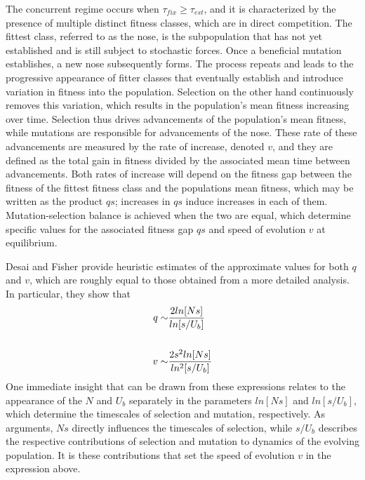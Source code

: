 \documentclass[12pt]{article}
\begin{document}
The concurrent regime occurs when $\tau_{fix} \ge \tau_{est}$, and it is characterized by the presence of multiple distinct fitness classes, which are in direct competition.  The fittest class, referred to as the nose, is the subpopulation that has not yet established and is still subject to stochastic forces.  Once a beneficial mutation establishes, a new nose subsequently forms.  The process repeats and leads to the progressive appearance of fitter classes that eventually establish and introduce variation in fitness into the population.  Selection on the other hand continuously removes this variation, which results in the population's mean fitness increasing over time.  Selection thus drives advancements of the population's mean fitness, while mutations are responsible for advancements of the nose.  These rate of these advancements are measured by the rate of increase, denoted $v$, and they are defined as the total gain in fitness divided by the associated mean time between advancements.  Both rates of increase will depend on the fitness gap between the fitness of the fittest fitness class and the populations mean fitness, which may be written as the product $qs$; increases in $qs$ induce increases in each of them.  Mutation-selection balance is achieved when the two are equal, which determine specific values for the associated fitness gap $qs$ and speed of evolution $v$ at equilibrium. 

Desai and Fisher provide heuristic estimates of the approximate values for both $q$ and $v$, which are roughly equal to those obtained from a more detailed analysis.  In particular, they show that
\begin{equation}
\begin{aligned}
q \sim & {2ln[Ns] \over ln[s/U_b]} \\   
\\
v \sim & {2s^2ln[Ns] \over ln^2[s/U_b]}
\end{aligned}
\end{equation}
One immediate insight that can be drawn from these expressions relates to the appearance of the $N$ and $U_b$ separately in the parameters $ln[Ns]$ and $ln[s/U_b]$, which determine the timescales of selection and mutation, respectively.  As arguments, $Ns$ directly influences the timescales of selection, while $s/U_b$ describes the respective contributions of selection and mutation to dynamics of the evolving population.  It is these contributions that set the speed of evolution $v$ in the expression above.   
\end{document}
